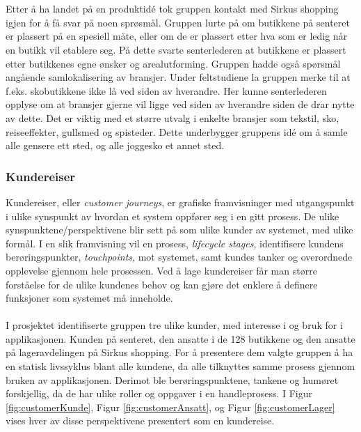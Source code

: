 \\\\
Etter å ha landet på en produktidé tok gruppen kontakt med Sirkus shopping igjen for å få svar på noen sprøsmål. Gruppen lurte på om butikkene på senteret er plassert på en spesiell måte, eller om de er plassert etter hva som er ledig når en butikk vil etablere seg. På dette svarte senterlederen at butikkene er plassert etter butikkenes egne ønsker og arealutforming. Gruppen hadde også spørsmål angående samlokalisering av bransjer. Under feltstudiene la gruppen merke til at f.eks. skobutikkene ikke lå ved siden av hverandre. Her kunne senterlederen opplyse om at bransjer gjerne vil ligge ved siden av hverandre siden de drar nytte av dette. Det er viktig med et større utvalg i enkelte bransjer som tekstil, sko, reiseeffekter, gullsmed og spisteder. Dette underbygger gruppens idé om å samle alle gensere ett sted, og alle joggesko et annet sted.

\subsubsection{Kundereiser}
\label{sec:kundereise}
Kundereiser, eller \textit{customer journeys}, er grafiske framvisninger med utgangspunkt i ulike synspunkt av hvordan et system oppfører seg i en gitt prosess\cite{servicedesign}. De ulike synspunktene/perspektivene blir sett på som ulike kunder av systemet, med ulike formål. I en slik framvisning vil en prosess, \textit{lifecycle stages}, identifisere kundens berøringspunkter, \textit{touchpoints}, mot systemet, samt kundes tanker og overordnede opplevelse gjennom hele prosessen. Ved å lage kundereiser får man større forståelse for de ulike kundenes behov og kan gjøre det enklere å definere funksjoner som systemet må inneholde\cite{servicedesign}.
\\\\
I prosjektet identifiserte gruppen tre ulike kunder, med interesse i og bruk for i applikasjonen. Kunden på senteret, den ansatte i de 128 butikkene og den ansatte på lageravdelingen på Sirkus shopping. For å presentere dem valgte gruppen å ha en statisk livssyklus blant alle kundene, da alle tilknyttes samme prosess gjennom bruken av applikasjonen. Derimot ble berøringspunktene, tankene og humøret forskjellig, da de har ulike roller og oppgaver i en handleprosess. I Figur \ref{fig:customerKunde}, Figur \ref{fig:customerAnsatt}, og Figur  \ref{fig:customerLager} vises hver av disse perspektivene presentert som en kundereise. 


